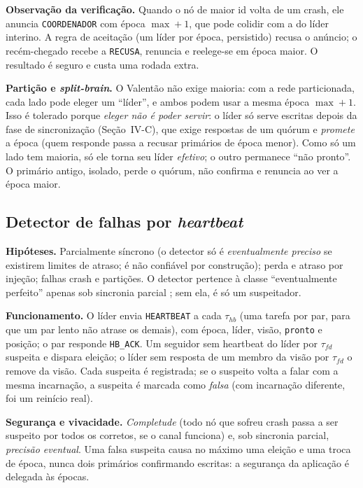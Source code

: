 \documentclass[conference,a4paper]{IEEEtran}
\begin{document}
\textbf{Observação da verificação.} Quando o nó de maior id volta de um
crash, ele anuncia \texttt{COORDENADOR} com época $\max+1$, que pode
colidir com a do líder interino. A regra de aceitação (um líder por época,
persistido) recusa o anúncio; o recém-chegado recebe a \texttt{RECUSA},
renuncia e reelege-se em época maior. O resultado é seguro e custa uma
rodada extra.

\textbf{Partição e \emph{split-brain}.} O Valentão não exige maioria: com
a rede particionada, cada lado pode eleger um ``líder'', e ambos podem usar
a mesma época $\max+1$. Isso é tolerado porque \emph{eleger não é poder
servir}: o líder só serve escritas depois da fase de sincronização
(Seção~IV-C), que exige respostas de um quórum e \emph{promete} a época
(quem responde passa a recusar primários de época menor). Como só um lado
tem maioria, só ele torna seu líder \emph{efetivo}; o outro permanece
``não pronto''. O primário antigo, isolado, perde o quórum, não confirma e
renuncia ao ver a época maior.

\subsection{Detector de falhas por \emph{heartbeat}}

\textbf{Hipóteses.} Parcialmente síncrono (o detector só é \emph{eventualmente
preciso} se existirem limites de atraso; é não confiável por construção);
perda e atraso por injeção; falhas crash e partições. O detector pertence à
classe ``eventualmente perfeito'' apenas sob sincronia parcial
\cite{chandra1996}; sem ela, é só um suspeitador.

\textbf{Funcionamento.} O líder envia \texttt{HEARTBEAT} a cada $\tau_{hb}$
(uma tarefa por par, para que um par lento não atrase os demais), com época,
líder, visão, \texttt{pronto} e posição; o par responde \texttt{HB\_ACK}. Um
seguidor sem heartbeat do líder por $\tau_{fd}$ suspeita e dispara eleição;
o líder sem resposta de um membro da visão por $\tau_{fd}$ o remove da visão.
Cada suspeita é registrada; se o suspeito volta a falar com a mesma
incarnação, a suspeita é marcada como \emph{falsa} (com incarnação diferente,
foi um reinício real).

\textbf{Segurança e vivacidade.} \emph{Completude} (todo nó que sofreu crash
passa a ser suspeito por todos os corretos, se o canal funciona) e, sob
sincronia parcial, \emph{precisão eventual}. Uma falsa suspeita causa no
máximo uma eleição e uma troca de época, nunca dois primários confirmando
escritas: a segurança da aplicação é delegada às épocas.
\end{document}

